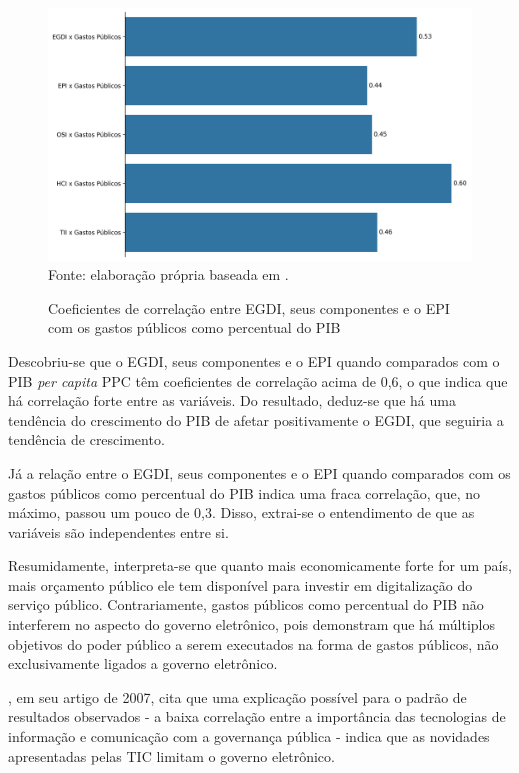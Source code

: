 \begin{figure}[H]
	\centering
	\caption{Coeficientes de correlação entre EGDI, seus componentes e o EPI com os gastos públicos como percentual do PIB}
    \includegraphics[width=1\linewidth]{figuras/correlacao_egdi_gastospublicos.png}
	\label{fig:correlacao_egdi_gastospublicos}
	\footnotesize{Fonte: elaboração própria baseada em \cite{FMI_gov_expenditure}.}
\end{figure}

Descobriu-se que o EGDI, seus componentes e o EPI quando comparados com o PIB \textit{per capita} PPC têm coeficientes de correlação acima de 0,6, o que indica que há correlação forte entre as variáveis. Do resultado, deduz-se que há uma tendência do crescimento do PIB de afetar positivamente o EGDI, que seguiria a tendência de crescimento.

Já a relação entre o EGDI, seus componentes e o EPI quando comparados com os gastos públicos como percentual do PIB indica uma fraca correlação, que, no máximo, passou um pouco de 0,3. Disso, extrai-se o entendimento de que as variáveis são independentes entre si.

Resumidamente, interpreta-se que quanto mais economicamente forte for um país, mais orçamento público ele tem disponível para investir em digitalização do serviço público. Contrariamente, gastos públicos como percentual do PIB não interferem no aspecto do governo eletrônico, pois demonstram que há múltiplos objetivos do poder público a serem executados na forma de gastos públicos, não exclusivamente ligados a governo eletrônico.

\cite{singh2007country}, em seu artigo de 2007, cita que uma explicação possível para o padrão de resultados observados - a baixa correlação entre a importância das tecnologias de informação e comunicação com a governança pública - indica que as novidades apresentadas pelas TIC limitam o governo eletrônico.

